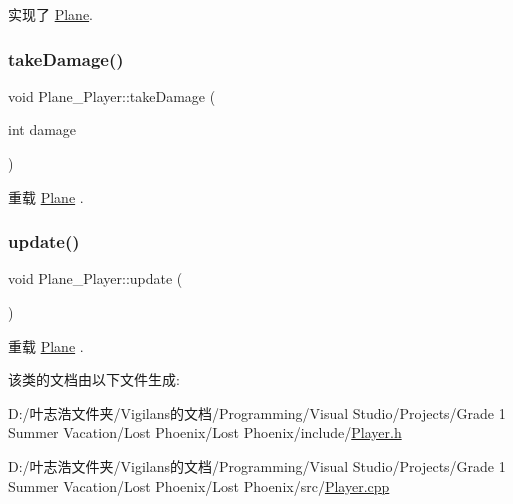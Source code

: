 实现了 \hyperlink{class_plane_af999499b5e79309d94004e8d012fe9c4}{Plane}.

\mbox{\label{class_plane___player_a40e7f20858e2738e5a72b15eb1c28421}} 
\subsubsection{\texorpdfstring{take\+Damage()}{takeDamage()}}
{\footnotesize\ttfamily void Plane\+\_\+\+Player\+::take\+Damage (\begin{DoxyParamCaption}\item[{int}]{damage }\end{DoxyParamCaption})\hspace{0.3cm}{\ttfamily [virtual]}}



重载 \hyperlink{class_plane_a1a93dbb00292aaae274c152079f5f6f3}{Plane} .

\mbox{\label{class_plane___player_ae68c08ce11fad9fd164c00eb4db6b348}} 
\subsubsection{\texorpdfstring{update()}{update()}}
{\footnotesize\ttfamily void Plane\+\_\+\+Player\+::update (\begin{DoxyParamCaption}{ }\end{DoxyParamCaption})\hspace{0.3cm}{\ttfamily [virtual]}}



重载 \hyperlink{class_plane_a7fbb07f76503fe057772e01f542afc32}{Plane} .



该类的文档由以下文件生成\+:\begin{DoxyCompactItemize}
\item 
D\+:/叶志浩文件夹/\+Vigilans的文档/\+Programming/\+Visual Studio/\+Projects/\+Grade 1 Summer Vacation/\+Lost Phoenix/\+Lost Phoenix/include/\hyperlink{_player_8h}{Player.\+h}\item 
D\+:/叶志浩文件夹/\+Vigilans的文档/\+Programming/\+Visual Studio/\+Projects/\+Grade 1 Summer Vacation/\+Lost Phoenix/\+Lost Phoenix/src/\hyperlink{_player_8cpp}{Player.\+cpp}\end{DoxyCompactItemize}
